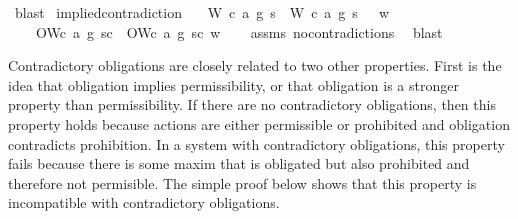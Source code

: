 \begin{isabellebody}
\ blast\isanewline
%
%
\endisatagproof
{\isafoldproof}%
%
\isadelimproof
\isanewline
%
\endisadelimproof
\isanewline
{}\isamarkupfalse%
\ implied{\isacharunderscore}contradiction{\isacharcolon}\isanewline
\ \ \ {\isachardoublequoteopen}{\isacharparenleft}{\isacharparenleft}{\isacharparenleft}W\ {\isacharparenleft}c{}{\isacharcomma}\ a{}{\isacharcomma}\ g{}{\isacharparenright}\ s{\isacharparenright}\ \isactrlbold {\isasymand}\ {\isacharparenleft}W\ {\isacharparenleft}c{}{\isacharcomma}\ a{}{\isacharcomma}\ g{}{\isacharparenright}\ s{\isacharparenright}{\isacharparenright}\ \isactrlbold {\isasymrightarrow}\ \isactrlbold {\isasymbottom}{\isacharparenright}\ w{\isachardoublequoteclose}\isanewline
\ \ \ {\isachardoublequoteopen}\isactrlbold {\isasymnot}\ {\isacharparenleft}O{\isacharbraceleft}W{\isacharparenleft}c{}{\isacharcomma}\ a{}{\isacharcomma}\ g{}{\isacharparenright}\ s{\isacharbar}c{\isacharbraceright}\ \isactrlbold {\isasymand}\ O{\isacharbraceleft}W{\isacharparenleft}c{}{\isacharcomma}\ a{}{\isacharcomma}\ g{}{\isacharparenright}\ s{\isacharbar}c{\isacharbraceright}{\isacharparenright}\ w{\isachardoublequoteclose}\isanewline
%
\isadelimproof
\ \ %
\endisadelimproof
%
\isatagproof
{}\isamarkupfalse%
\ assms\ no{\isacharunderscore}contradictions\ \isamarkupfalse%
\ blast\isanewline
%
%
\endisatagproof
{\isafoldproof}%
%
\isadelimproof
%
\endisadelimproof
%
\begin{isamarkuptext}%
Contradictory obligations are closely related to two other properties. First is the idea that obligation implies permissibility, or 
that obligation is a stronger property than permissibility. If there are no contradictory obligations, 
then this property holds because actions are either permissible or prohibited and obligation contradicts
prohibition. In a system with contradictory obligations, this property fails because there is some
maxim that is obligated but also prohibited and therefore not permisible. The simple proof below 
shows that this property is incompatible with contradictory obligations.


\end{isamarkuptext}
\end{isabellebody}
